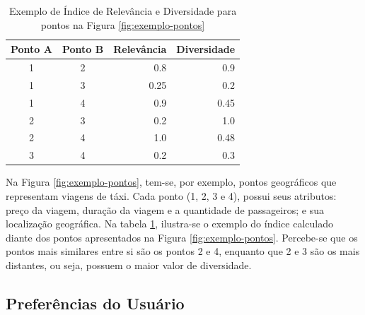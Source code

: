 \begin{table}[!h]
	\centering
	\begin{tabular}{|c|c|r|r|}
	\hline
	\multicolumn{1}{|c|}{\textbf{Ponto A}} & \multicolumn{1}{c|}{\textbf{Ponto B}} & \multicolumn{1}{c|}{\textbf{Relevância}} & \multicolumn{1}{c|}{\textbf{Diversidade}} \\ \hline
	1                                      & 2                                     & 0.8                                      & 0.9                                       \\ \hline
	1                                      & 3                                     & 0.25                                     & 0.2                                       \\ \hline
	1                                      & 4                                     & 0.9                                      & 0.45                                      \\ \hline
	2                                      & 3                                     & 0.2                                      & 1.0                                       \\ \hline
	2                                      & 4                                     & 1.0                                      & 0.48                                      \\ \hline
	3                                      & 4                                     & 0.2                                      & 0.3                                       \\ \hline
	\end{tabular}
	\caption{Exemplo de Índice de Relevância e Diversidade para pontos na Figura \ref{fig:exemplo-pontos}}
	\label{table:exemplo-indice}
\end{table}

Na Figura \ref{fig:exemplo-pontos}, tem-se, por exemplo, pontos geográficos que representam viagens de táxi. Cada ponto (1, 2, 3 e 4), possui seus atributos: preço da viagem, duração da viagem e a quantidade de passageiros; e sua localização geográfica. Na tabela \ref{table:exemplo-indice}, ilustra-se o exemplo do índice calculado diante dos pontos apresentados na Figura \ref{fig:exemplo-pontos}. Percebe-se que os pontos mais similares entre si são os pontos 2 e 4, enquanto que 2 e 3 são os mais distantes, ou seja, possuem o maior valor de diversidade.


\subsection{Preferências do Usuário}

